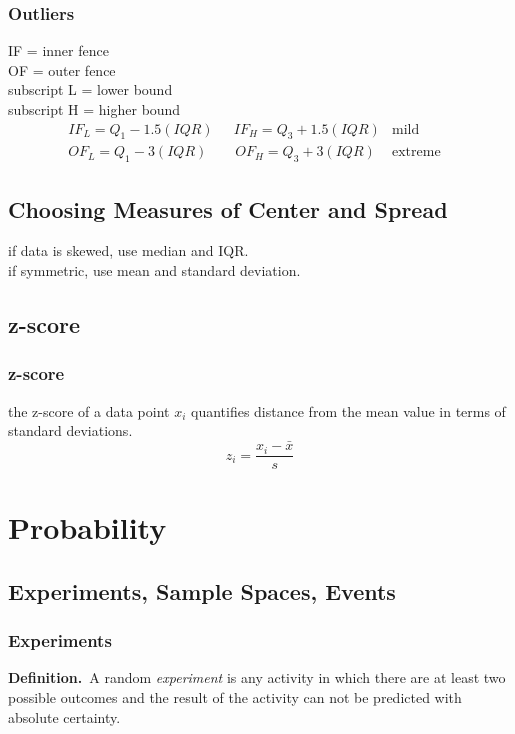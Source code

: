 \documentclass{report}
\newcommand{\dfn}[1]{\textbf{Definition.}\ #1 }
\begin{document}
        \subsection{Outliers}
        IF = inner fence\\
        OF = outer fence\\
        subscript L = lower bound\\
        subscript H = higher bound
        \begin{align}
        &IF_L=Q_1-1.5(IQR) \quad\ \ IF_H=Q_3+1.5(IQR) &\text{mild} &&\\
        &OF_L=Q_1-3(IQR) \qquad OF_H=Q_3+3(IQR) &\text{extreme}
        \end{align}

	\section{Choosing Measures of Center and Spread}
	if data is skewed, use median and IQR.\\
	if symmetric, use mean and standard deviation.

	\section{z-score}
        \subsection{z-score}
        the z-score of a data point $x_i$ quantifies distance from the mean value in terms of standard deviations.
        \begin{equation}z_i=\frac{x_i-\bar{x}}{s}\end{equation} 

\chapter{Probability}  %
    \section{Experiments, Sample Spaces, Events}  %
        \subsection{Experiments}  %
            \dfn{A random \emph{experiment} is any activity in which there are at least two possible outcomes and the result of the activity can not be predicted with absolute certainty.}
\end{document}
